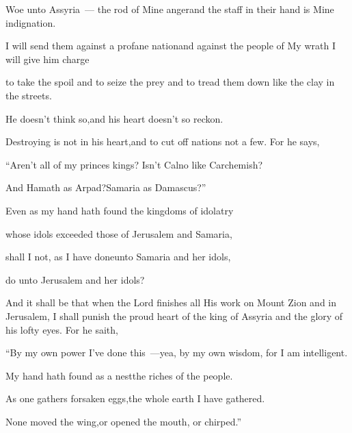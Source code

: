 
\begin{inparaenum}
  \pa{} Woe unto Assyria~--- the rod of Mine anger\pa{}and the staff in their hand is Mine indignation.%

  \pa{} I will send them against a profane nation\pa{}and against the people of My wrath I will give him charge%

  \pa{}to take the spoil and to seize the prey%
  \pa{}and to tread them down like the clay in the streets.%

  \pa{} He doesn't think so,\pa{}and his heart doesn't so reckon.%

  \pa{}Destroying is not in his heart,\pa{}and to cut off nations not a few.  For he says,%

  \pa{}``Aren't all of my princes kings?  Isn't Calno like Carchemish?%

  \pa{}And Hamath as Arpad?\pa{}Samaria as Damascus?''%

  \pa{} Even as my hand hath found the kingdoms of idolatry%

  \pa{}whose idols exceeded those of Jerusalem and Samaria,%

  \pa{} shall I not, as I have done\pa{}unto Samaria and her idols,%

  \pa{}do unto Jerusalem and her idols?%

  \noindent {} And it shall be that when the Lord finishes all His work on Mount Zion and in Jerusalem, I shall punish the proud heart of the king of Assyria and the glory of his lofty eyes.  For he saith,\smallskip%

  \pa{}``By my own power I've done this~---\pa{}yea, by my own wisdom, for I am intelligent.%

  \pa{} My hand hath found as a nest\pa{}the riches of the people.%

  \pa{}As one gathers forsaken eggs,\pa{}the whole earth I have gathered.%

  \pa{}None moved the wing,\pa{}or opened the mouth, or chirped.''%


\end{inparaenum}
